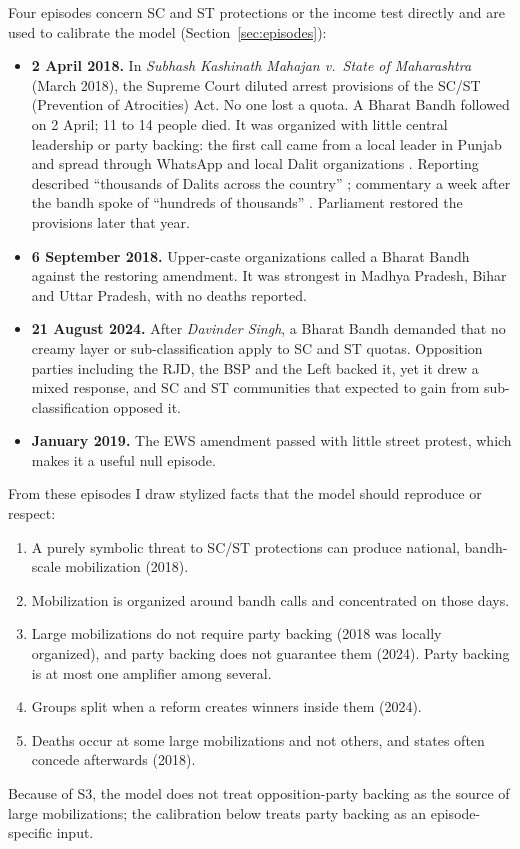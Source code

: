 \documentclass[11pt,a4paper]{article}
\begin{document}
Four episodes concern SC and ST protections or the income test directly and are used to calibrate the model (Section~\ref{sec:episodes}):
\begin{itemize}
\item \textbf{2 April 2018.} In \emph{Subhash Kashinath Mahajan v.\ State of Maharashtra} (March 2018), the Supreme Court diluted arrest provisions of the SC/ST (Prevention of Atrocities) Act. No one lost a quota. A Bharat Bandh followed on 2 April; 11 to 14 people died. It was organized with little central leadership or party backing: the first call came from a local leader in Punjab and spread through WhatsApp and local Dalit organizations \citep{scroll2018whatsapp}. Reporting described ``thousands of Dalits across the country'' \citep{donthi2018}; commentary a week after the bandh spoke of ``hundreds of thousands'' \citep{aljazeera2018opinion}. Parliament restored the provisions later that year.
\item \textbf{6 September 2018.} Upper-caste organizations called a Bharat Bandh against the restoring amendment. It was strongest in Madhya Pradesh, Bihar and Uttar Pradesh, with no deaths reported.
\item \textbf{21 August 2024.} After \emph{Davinder Singh}, a Bharat Bandh demanded that no creamy layer or sub-classification apply to SC and ST quotas. Opposition parties including the RJD, the BSP and the Left backed it, yet it drew a mixed response, and SC and ST communities that expected to gain from sub-classification opposed it.
\item \textbf{January 2019.} The EWS amendment passed with little street protest, which makes it a useful null episode.
\end{itemize}

From these episodes I draw stylized facts that the model should reproduce or respect:
\begin{enumerate}[label=\textbf{S\arabic*.}]
\item A purely symbolic threat to SC/ST protections can produce national, bandh-scale mobilization (2018).
\item Mobilization is organized around bandh calls and concentrated on those days.
\item Large mobilizations do not require party backing (2018 was locally organized), and party backing does not guarantee them (2024). Party backing is at most one amplifier among several.
\item Groups split when a reform creates winners inside them (2024).
\item Deaths occur at some large mobilizations and not others, and states often concede afterwards (2018).
\end{enumerate}
Because of S3, the model does not treat opposition-party backing as the source of large mobilizations; the calibration below treats party backing as an episode-specific input.
\end{document}

